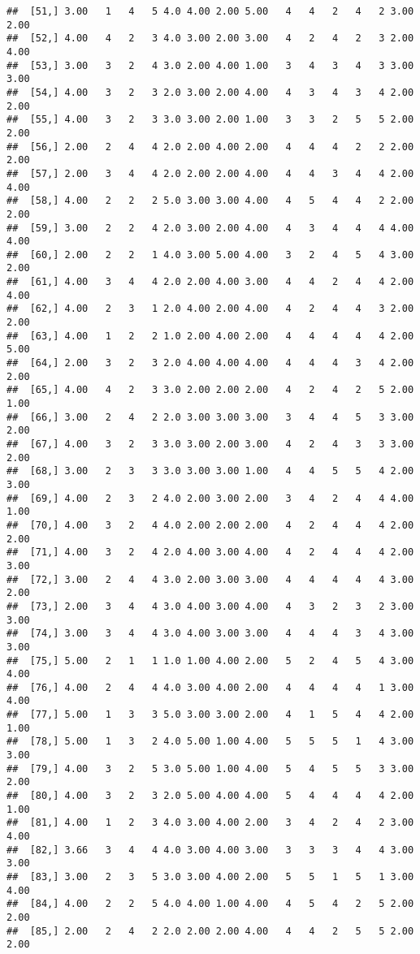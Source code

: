 \documentclass[]{article}
\begin{document}
\begin{verbatim}
##  [51,] 3.00   1   4   5 4.0 4.00 2.00 5.00   4   4   2   4   2 3.00 2.00
##  [52,] 4.00   4   2   3 4.0 3.00 2.00 3.00   4   2   4   2   3 2.00 4.00
##  [53,] 3.00   3   2   4 3.0 2.00 4.00 1.00   3   4   3   4   3 3.00 3.00
##  [54,] 4.00   3   2   3 2.0 3.00 2.00 4.00   4   3   4   3   4 2.00 2.00
##  [55,] 4.00   3   2   3 3.0 3.00 2.00 1.00   3   3   2   5   5 2.00 2.00
##  [56,] 2.00   2   4   4 2.0 2.00 4.00 2.00   4   4   4   2   2 2.00 2.00
##  [57,] 2.00   3   4   4 2.0 2.00 2.00 4.00   4   4   3   4   4 2.00 4.00
##  [58,] 4.00   2   2   2 5.0 3.00 3.00 4.00   4   5   4   4   2 2.00 2.00
##  [59,] 3.00   2   2   4 2.0 3.00 2.00 4.00   4   3   4   4   4 4.00 4.00
##  [60,] 2.00   2   2   1 4.0 3.00 5.00 4.00   3   2   4   5   4 3.00 2.00
##  [61,] 4.00   3   4   4 2.0 2.00 4.00 3.00   4   4   2   4   4 2.00 4.00
##  [62,] 4.00   2   3   1 2.0 4.00 2.00 4.00   4   2   4   4   3 2.00 2.00
##  [63,] 4.00   1   2   2 1.0 2.00 4.00 2.00   4   4   4   4   4 2.00 5.00
##  [64,] 2.00   3   2   3 2.0 4.00 4.00 4.00   4   4   4   3   4 2.00 2.00
##  [65,] 4.00   4   2   3 3.0 2.00 2.00 2.00   4   2   4   2   5 2.00 1.00
##  [66,] 3.00   2   4   2 2.0 3.00 3.00 3.00   3   4   4   5   3 3.00 2.00
##  [67,] 4.00   3   2   3 3.0 3.00 2.00 3.00   4   2   4   3   3 3.00 2.00
##  [68,] 3.00   2   3   3 3.0 3.00 3.00 1.00   4   4   5   5   4 2.00 3.00
##  [69,] 4.00   2   3   2 4.0 2.00 3.00 2.00   3   4   2   4   4 4.00 1.00
##  [70,] 4.00   3   2   4 4.0 2.00 2.00 2.00   4   2   4   4   4 2.00 2.00
##  [71,] 4.00   3   2   4 2.0 4.00 3.00 4.00   4   2   4   4   4 2.00 3.00
##  [72,] 3.00   2   4   4 3.0 2.00 3.00 3.00   4   4   4   4   4 3.00 2.00
##  [73,] 2.00   3   4   4 3.0 4.00 3.00 4.00   4   3   2   3   2 3.00 3.00
##  [74,] 3.00   3   4   4 3.0 4.00 3.00 3.00   4   4   4   3   4 3.00 3.00
##  [75,] 5.00   2   1   1 1.0 1.00 4.00 2.00   5   2   4   5   4 3.00 4.00
##  [76,] 4.00   2   4   4 4.0 3.00 4.00 2.00   4   4   4   4   1 3.00 4.00
##  [77,] 5.00   1   3   3 5.0 3.00 3.00 2.00   4   1   5   4   4 2.00 1.00
##  [78,] 5.00   1   3   2 4.0 5.00 1.00 4.00   5   5   5   1   4 3.00 3.00
##  [79,] 4.00   3   2   5 3.0 5.00 1.00 4.00   5   4   5   5   3 3.00 2.00
##  [80,] 4.00   3   2   3 2.0 5.00 4.00 4.00   5   4   4   4   4 2.00 1.00
##  [81,] 4.00   1   2   3 4.0 3.00 4.00 2.00   3   4   2   4   2 3.00 4.00
##  [82,] 3.66   3   4   4 4.0 3.00 4.00 3.00   3   3   3   4   4 3.00 3.00
##  [83,] 3.00   2   3   5 3.0 3.00 4.00 2.00   5   5   1   5   1 3.00 4.00
##  [84,] 4.00   2   2   5 4.0 4.00 1.00 4.00   4   5   4   2   5 2.00 2.00
##  [85,] 2.00   2   4   2 2.0 2.00 2.00 4.00   4   4   2   5   5 2.00 2.00

\end{verbatim}
\end{document}
